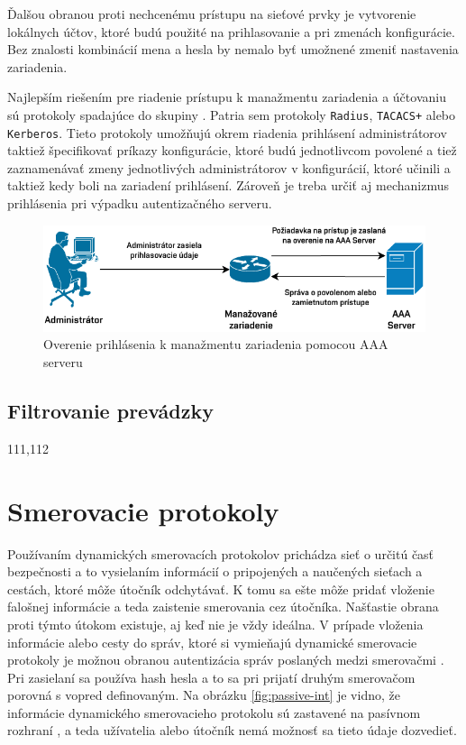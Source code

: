 \newpage
Ďalšou obranou proti nechcenému prístupu na sieťové prvky je vytvorenie lokálnych účtov, ktoré budú použité na prihlasovanie a pri zmenách konfigurácie. Bez znalosti kombinácií mena a hesla by nemalo byť umožnené zmeniť nastavenia zariadenia.  

Najlepším riešením pre riadenie prístupu k manažmentu zariadenia a účtovaniu sú protokoly spadajúce do skupiny . Patria sem protokoly \texttt{Radius}, \texttt{TACACS+} alebo \texttt{Kerberos}. Tieto protokoly umožňujú okrem riadenia prihlásení administrátorov taktiež špecifikovať príkazy konfigurácie, ktoré budú jednotlivcom povolené a tiež zaznamenávať zmeny jednotlivých administrátorov v konfigurácií, ktoré učinili a taktiež kedy boli na zariadení prihlásení. Zároveň je treba určiť aj mechanizmus prihlásenia pri výpadku autentizačného serveru.

\begin{figure}[H]
	\begin{center}
		\includegraphics[scale=1.1]{obrazky/AAA.pdf}
	\end{center}
	\caption[Overenie prihlásenia k manažmentu zariadenia pomocou AAA serveru]{Overenie prihlásenia k manažmentu zariadenia pomocou AAA serveru}
	\label{fig:aaa-mngmt}
\end{figure} 



\subsection*{Filtrovanie prevádzky}
111,112
\section*{Smerovacie protokoly}
Používaním dynamických smerovacích protokolov prichádza sieť o určitú časť bezpečnosti a to vysielaním informácií o pripojených a naučených sieťach a cestách, ktoré môže útočník odchytávať. K tomu sa ešte môže pridať vloženie falošnej informácie a teda zaistenie smerovania cez útočníka. Našťastie obrana proti týmto útokom existuje, aj keď nie je vždy ideálna. V prípade vloženia informácie alebo cesty do správ, ktoré si vymieňajú dynamické smerovacie protokoly je možnou obranou autentizácia správ poslaných medzi smerovačmi \cite{McMillan2018} \cite{Singh2018} \cite{CIS_DrTLsgXv24lxeIIM}. Pri zasielaní sa používa hash hesla a to sa pri prijatí druhým smerovačom porovná s vopred definovaným. Na obrázku \ref{fig:passive-int} je vidno, že informácie dynamického smerovacieho protokolu sú zastavené na pasívnom rozhraní \cite{Khandelwal2016}, a teda užívatelia alebo útočník nemá možnosť sa tieto údaje dozvedieť.

